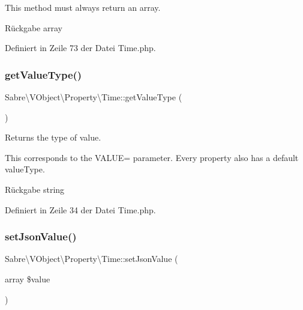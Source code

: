 This method must always return an array.

\begin{DoxyReturn}{Rückgabe}
array 
\end{DoxyReturn}


Definiert in Zeile 73 der Datei Time.\+php.

\mbox{\label{class_sabre_1_1_v_object_1_1_property_1_1_time_aeaf991a46605cc727cdf033b0a12a527}} 
\subsubsection{\texorpdfstring{get\+Value\+Type()}{getValueType()}}
{\footnotesize\ttfamily Sabre\textbackslash{}\+V\+Object\textbackslash{}\+Property\textbackslash{}\+Time\+::get\+Value\+Type (\begin{DoxyParamCaption}{ }\end{DoxyParamCaption})}

Returns the type of value.

This corresponds to the V\+A\+L\+UE= parameter. Every property also has a \textquotesingle{}default\textquotesingle{} value\+Type.

\begin{DoxyReturn}{Rückgabe}
string 
\end{DoxyReturn}


Definiert in Zeile 34 der Datei Time.\+php.

\mbox{\label{class_sabre_1_1_v_object_1_1_property_1_1_time_a5a666f85b8c759f760cc24666143f065}} 
\subsubsection{\texorpdfstring{set\+Json\+Value()}{setJsonValue()}}
{\footnotesize\ttfamily Sabre\textbackslash{}\+V\+Object\textbackslash{}\+Property\textbackslash{}\+Time\+::set\+Json\+Value (\begin{DoxyParamCaption}\item[{array}]{\$value }\end{DoxyParamCaption})}

